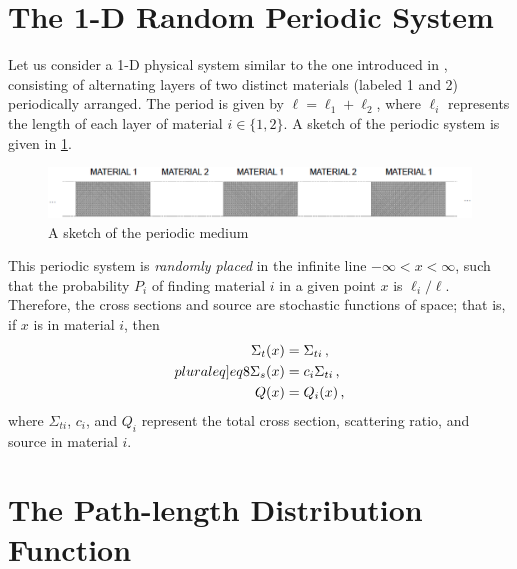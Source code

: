 \documentclass[12pt]{article}
\begin{document}
\section{The 1-D Random Periodic System}\label{sec2}

Let us consider a 1-D physical system similar to the one introduced in \cite{zuc94}, consisting of alternating layers of two distinct materials (labeled 1 and 2) periodically arranged.
The period is given by $\ell = \ell_1 + \ell_2$, where $\ell_i$ represents the length of each layer of material $i \in \{1,2\}$.
A sketch of the periodic system is given in \cref{fig1}.
\begin{figure}[htb]
  \centering
  \includegraphics[width=\textwidth]{fig1.eps}
  \caption{A sketch of the periodic medium}
  \label{fig1}
\end{figure}

This periodic system is {\em randomly placed} in the infinite line $-\infty < x < \infty$, such that the probability $P_i$ of finding material $i$ in a given point $x$ is $\ell_i/\ell$.
Therefore, the cross sections and source are stochastic functions of space; that is, if $x$ is in material $i$, then
\begin{subequations}\label[pluraleq]{eq8}
\begin{align}
\Sigma_t(x) &= \Sigma_{ti}\, ,\\
\Sigma_s(x) &= c_i \Sigma_{ti}\, ,\\
Q(x) &= Q_i(x) \, ,
\end{align}
\end{subequations}
where $\Sigma_{ti}$, $c_i$, and $Q_i$ represent the total cross section, scattering ratio, and source in material $i$. 

\section{The Path-length Distribution Function}\label{sec3}
\end{document}
